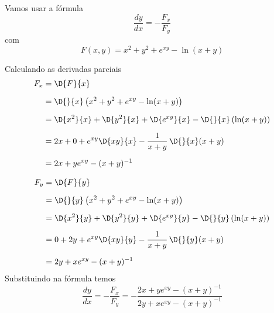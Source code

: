 \documentclass[a4paper,12pt,fleqn]{article}
\begin{document}
\begin{answer}
  Vamos usar a fórmula
  \[
    \frac{dy}{dx} = - \frac{F_x}{F_y}
  \]
  com
  \[
    F(x, y) = x^2 + y^2 + e^{xy} - \ln(x + y)
  \]

  Calculando as derivadas parciais
  \begin{align*}
    F_x
    & = \D{F}{x}
    \\[2mm]
    & = \D{}{x} \left(x^2 + y^2 + e^{xy} - \ln(x + y)\right)
    \\[2mm]
    & = \D{x^2}{x}
      + \D{y^2}{x}
      + \D{e^{xy}}{x}
      - \D{}{x} \left(\ln(x + y)\right)
    \\[2mm]
    & = 2x + 0
      + e^{xy}\D{xy}{x}
      - \frac{1}{x + y}\,\D{}{x} (x + y)
    \\[2mm]
    & = 2x + ye^{xy} - (x + y)^{-1}
  \end{align*}

  \begin{align*}
    F_y
    & = \D{F}{y}
    \\[2mm]
    & = \D{}{y} \left(x^2 + y^2 + e^{xy} - \ln(x + y)\right)
    \\[2mm]
    & = \D{x^2}{y}
      + \D{y^2}{y}
      + \D{e^{xy}}{y}
      - \D{}{y} \left(\ln(x + y)\right)
    \\[2mm]
    & = 0 + 2y
      + e^{xy}\D{xy}{y}
      - \frac{1}{x + y}\,\D{}{y} (x + y)
    \\[2mm]
    & = 2y + xe^{xy} - (x + y)^{-1}
  \end{align*}
  Substituindo na fórmula temos
  \[
    \frac{dy}{dx}
    = - \frac{F_x}{F_y}
    = - \frac{2x + ye^{xy} - (x + y)^{-1}}{2y + xe^{xy} - (x + y)^{-1}}
  \]
\end{answer}

\end{document}
